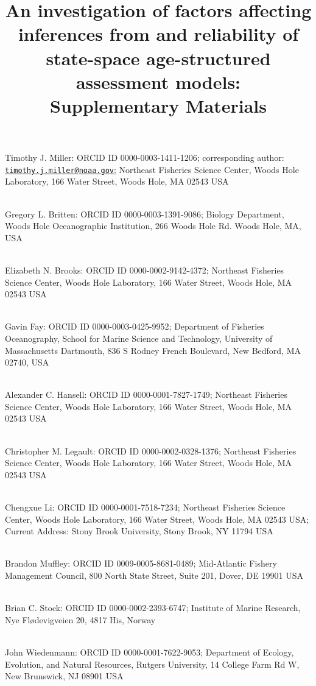 \documentclass[
  12pt,
]{article}
\title{An investigation of factors affecting inferences from and
reliability of state-space age-structured assessment models:\\
Supplementary Materials}
\author{}
\date{\vspace{-2.5em}}
\begin{document}
\maketitle

Timothy J. Miller: ORCID ID 0000-0003-1411-1206; corresponding author:
\href{mailto:timothy.j.miller@noaa.gov}{\nolinkurl{timothy.j.miller@noaa.gov}};
Northeast Fisheries Science Center, Woods Hole Laboratory, 166 Water
Street, Woods Hole, MA 02543 USA\\
\strut \\
Gregory L. Britten: ORCID ID 0000-0003-1391-9086; Biology Department,
Woods Hole Oceanographic Institution, 266 Woods Hole Rd. Woods Hole, MA,
USA\\
\strut \\
Elizabeth N. Brooks: ORCID ID 0000-0002-9142-4372; Northeast Fisheries
Science Center, Woods Hole Laboratory, 166 Water Street, Woods Hole, MA
02543 USA\\
\strut \\
Gavin Fay: ORCID ID 0000-0003-0425-9952; Department of Fisheries
Oceanography, School for Marine Science and Technology, University of
Massachusetts Dartmouth, 836 S Rodney French Boulevard, New Bedford, MA
02740, USA\\
\strut \\
Alexander C. Hansell: ORCID ID 0000-0001-7827-1749; Northeast Fisheries
Science Center, Woods Hole Laboratory, 166 Water Street, Woods Hole, MA
02543 USA\\
\strut \\
Christopher M. Legault: ORCID ID 0000-0002-0328-1376; Northeast
Fisheries Science Center, Woods Hole Laboratory, 166 Water Street, Woods
Hole, MA 02543 USA\\
\strut \\
Chengxue Li: ORCID ID 0000-0001-7518-7234; Northeast Fisheries Science
Center, Woods Hole Laboratory, 166 Water Street, Woods Hole, MA 02543
USA; Current Address: Stony Brook University, Stony Brook, NY 11794
USA\\
\strut \\
Brandon Muffley: ORCID ID 0009-0005-8681-0489; Mid-Atlantic Fishery
Management Council, 800 North State Street, Suite 201, Dover, DE 19901
USA\\
\strut \\
Brian C. Stock: ORCID ID 0000-0002-2393-6747; Institute of Marine
Research, Nye Flødevigveien 20, 4817 His, Norway\\
\strut \\
John Wiedenmann: ORCID ID 0000-0001-7622-9053; Department of Ecology,
Evolution, and Natural Resources, Rutgers University, 14 College Farm Rd
W, New Brunswick, NJ 08901 USA\\
\end{document}
